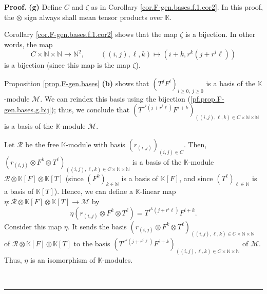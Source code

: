 \documentclass[numbers=enddot,12pt,final,onecolumn,notitlepage]{scrartcl}%
\theoremstyle{definition}
\newenvironment{proof}[1][Proof]{\noindent\textbf{#1.} }{\ \rule{0.5em}{0.5em}}
\begin{document}
\begin{proof}
\textbf{(g)} Define $C$ and $\zeta$ as in Corollary
\ref{cor.F-gen.bases.f.1.cor2}. In this proof, the $\otimes$ sign always shall
mean tensor products over $\mathbb{K}$.

Corollary \ref{cor.F-gen.bases.f.1.cor2} shows that the map $\zeta$ is a
bijection. In other words, the map
\begin{equation}
C\times\mathbb{N}\times\mathbb{N}\rightarrow\mathbb{N}^{2}%
,\ \ \ \ \ \ \ \ \ \ \left(  \left(  i,j\right)  ,\ell,k\right)
\mapsto\left(  i+k,r^{k}\left(  j+r^{i}\ell\right)  \right)
\label{pf.prop.F-gen.bases.g.bij}%
\end{equation}
is a bijection (since this map is the map $\zeta$).

Proposition \ref{prop.F-gen.bases} \textbf{(b)} shows that $\left(  T^{j}%
F^{i}\right)  _{i\geq0,\ j\geq0}$ is a basis of the $\mathbb{K}$-module
$\mathcal{M}$. We can reindex this basis using the bijection
(\ref{pf.prop.F-gen.bases.g.bij}); thus, we conclude that \newline$\left(
T^{r^{k}\left(  j+r^{i}\ell\right)  }F^{i+k}\right)  _{\left(  \left(
i,j\right)  ,\ell,k\right)  \in C\times\mathbb{N}\times\mathbb{N}}$ is a basis
of the $\mathbb{K}$-module $\mathcal{M}$.

Let $\mathcal{R}$ be the free $\mathbb{K}$-module with basis $\left(
r_{\left(  i,j\right)  }\right)  _{\left(  i,j\right)  \in C}$. Then,
\newline$\left(  r_{\left(  i,j\right)  }\otimes F^{k}\otimes T^{\ell}\right)
_{\left(  \left(  i,j\right)  ,\ell,k\right)  \in C\times\mathbb{N}%
\times\mathbb{N}}$ is a basis of the $\mathbb{K}$-module $\mathcal{R}%
\otimes\mathbb{K}\left[  F\right]  \otimes\mathbb{K}\left[  T\right]  $ (since
$\left(  F^{k}\right)  _{k\in\mathbb{N}}$ is a basis of $\mathbb{K}\left[
F\right]  $, and since $\left(  T^{\ell}\right)  _{\ell\in\mathbb{N}}$ is a
basis of $\mathbb{K}\left[  T\right]  $). Hence, we can define a $\mathbb{K}%
$-linear map $\eta:\mathcal{R}\otimes\mathbb{K}\left[  F\right]
\otimes\mathbb{K}\left[  T\right]  \rightarrow\mathcal{M}$ by%
\[
\eta\left(  r_{\left(  i,j\right)  }\otimes F^{k}\otimes T^{\ell}\right)
=T^{r^{k}\left(  j+r^{i}\ell\right)  }F^{i+k}.
\]
Consider this map $\eta$. It sends the basis $\left(  r_{\left(  i,j\right)
}\otimes F^{k}\otimes T^{\ell}\right)  _{\left(  \left(  i,j\right)
,\ell,k\right)  \in C\times\mathbb{N}\times\mathbb{N}}$ of $\mathcal{R}%
\otimes\mathbb{K}\left[  F\right]  \otimes\mathbb{K}\left[  T\right]  $ to the
basis $\left(  T^{r^{k}\left(  j+r^{i}\ell\right)  }F^{i+k}\right)  _{\left(
\left(  i,j\right)  ,\ell,k\right)  \in C\times\mathbb{N}\times\mathbb{N}}$ of
$\mathcal{M}$. Thus, $\eta$ is an isomorphism of $\mathbb{K}$-modules.


\end{proof}
\end{document}
